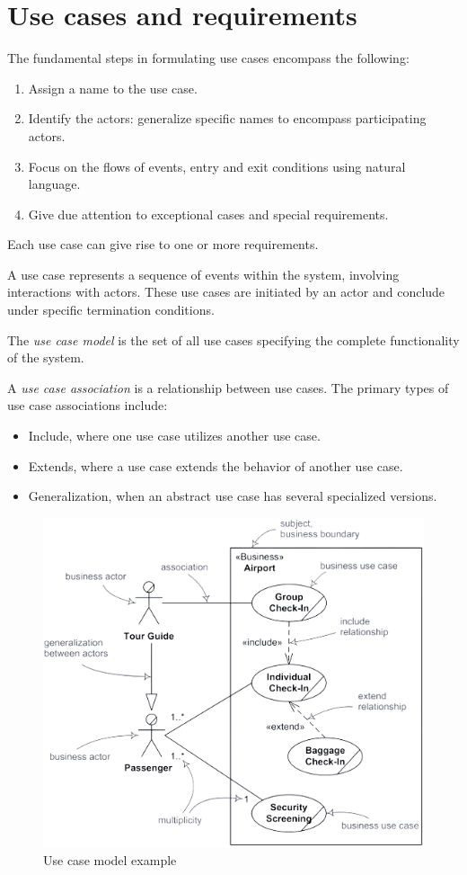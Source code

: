 \documentclass[12pt, a4paper]{report}
\begin{document}
    \section{Use cases and requirements}
    The fundamental steps in formulating use cases encompass the following:
    \begin{enumerate}
        \item Assign a name to the use case.
        \item Identify the actors: generalize specific names to encompass participating actors.
        \item Focus on the flows of events, entry and exit conditions using natural language.
        \item Give due attention to exceptional cases and special requirements.
    \end{enumerate}
    Each use case can give rise to one or more requirements.
     
    A use case represents a sequence of events within the system, involving interactions with actors. 
    These use cases are initiated by an actor and conclude under specific termination conditions.
    \begin{definition}
        The \emph{use case model} is the set of all use cases specifying the complete functionality of the system. 

        A \emph{use case association} is a relationship between use cases. 
        The primary types of use case associations include:
        \begin{itemize}
            \item Include, where one use case utilizes another use case.
            \item Extends, where a use case extends the behavior of another use case.
            \item Generalization, when an abstract use case has several specialized versions.
        \end{itemize}
    \end{definition}
    \begin{figure}[H]
        \centering
        \includegraphics[width=0.6\linewidth]{images/usecase.png}
        \caption{Use case model example}
    \end{figure}
\end{document}
